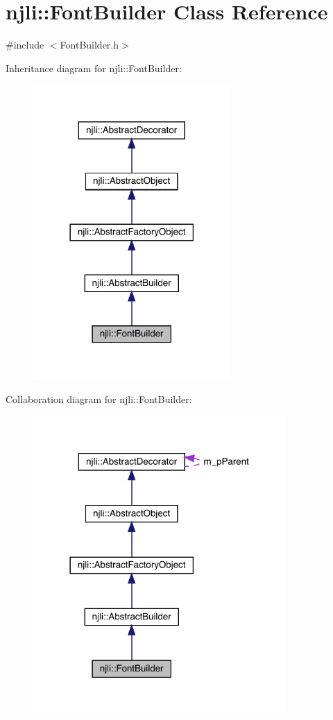 \hypertarget{classnjli_1_1_font_builder}{}\section{njli\+:\+:Font\+Builder Class Reference}
\label{classnjli_1_1_font_builder}


{\ttfamily \#include $<$Font\+Builder.\+h$>$}



Inheritance diagram for njli\+:\+:Font\+Builder\+:\nopagebreak
\begin{figure}[H]
\begin{center}
\leavevmode
\includegraphics[width=213pt]{classnjli_1_1_font_builder__inherit__graph}
\end{center}
\end{figure}


Collaboration diagram for njli\+:\+:Font\+Builder\+:\nopagebreak
\begin{figure}[H]
\begin{center}
\leavevmode
\includegraphics[width=273pt]{classnjli_1_1_font_builder__coll__graph}
\end{center}
\end{figure}
